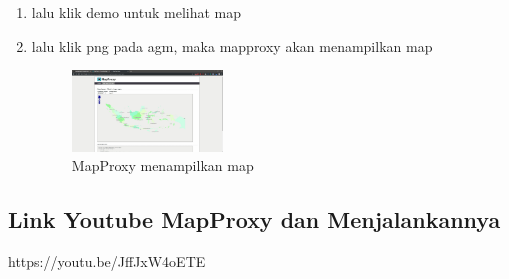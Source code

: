 \begin{enumerate}
  \item lalu klik demo untuk melihat map
  \item lalu klik png pada agm, maka mapproxy akan menampilkan map
  \hfill\break
  \begin{figure}[H]
  \includegraphics[width=4cm]{figures/tugas4/1174079/20.jpg}
  \centering
  \caption{MapProxy menampilkan map}
  \end{figure}

\end{enumerate}

\subsection{Link Youtube MapProxy dan Menjalankannya}
https://youtu.be/JffJxW4oETE


